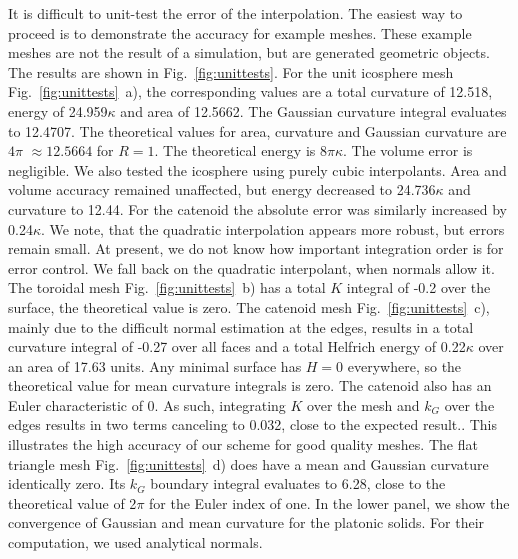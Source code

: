 \documentclass[twocolumn]{biophys-new}
\begin{document}
It is difficult to unit-test the error of the interpolation. The easiest way to proceed is to demonstrate the accuracy for example meshes. These example meshes are not the result of a simulation, but are generated geometric objects. The results are shown in Fig.~\ref{fig:unittests}. For the unit icosphere mesh Fig.~\ref{fig:unittests}~a), the corresponding values are a total curvature of 12.518, energy of 24.959$\kappa$ and area of 12.5662. The Gaussian curvature integral evaluates to 12.4707. The theoretical values for area, curvature and Gaussian curvature are $4\pi$ $\approx 12.5664$ for $R=1$. The theoretical energy is $8\pi \kappa$. The volume error is negligible. We also tested the icosphere using purely cubic interpolants. Area and volume accuracy remained unaffected, but energy decreased to 24.736$\kappa$ and curvature to 12.44. For the catenoid the absolute error was similarly increased by 0.24$\kappa$. We note, that the quadratic interpolation appears more robust, but errors remain small. At present, we do not know how important integration order is for error control. We fall back on the quadratic interpolant, when normals allow it. The toroidal mesh Fig.~\ref{fig:unittests}~b) has a total $K$ integral of -0.2 over the surface, the theoretical value is zero.
The catenoid mesh Fig.~\ref{fig:unittests}~c), mainly due to the difficult normal estimation at the edges, results in a total curvature integral of -0.27 over all faces and a total Helfrich energy of 0.22$\kappa$ over an area of 17.63 units. Any minimal surface has $H=0$ everywhere, so the theoretical value for mean curvature integrals is zero. The catenoid also has an Euler characteristic of 0. As such, integrating $K$ over the mesh and $k_G$ over the edges results in two terms canceling to 0.032, close to the expected result.. This illustrates the high accuracy of our scheme for good quality meshes. The flat triangle mesh Fig.~\ref{fig:unittests}~d) does have a mean and Gaussian curvature identically zero. Its $k_G$ boundary integral evaluates to 6.28, close to the theoretical value of 2$\pi$ for the Euler index of one. In the lower panel, we show the convergence of Gaussian and mean curvature for the platonic solids. For their computation, we used analytical normals.
\end{document}
